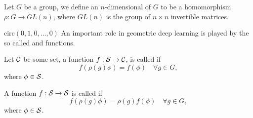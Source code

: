 \documentclass[../3.tex]{subfiles}
\begin{document}
    \begin{defn}
        Let $G$ be a group, we define an $n$-dimensional  of $G$ to be a homomorphism $\rho : G \to GL(n)$,
        where $GL(n)$ is the group of $n \times n$ invertible matrices.
    \end{defn}
    $\text{circ}(0,1,0,\dots,0)$
    An important role in geometric deep learning is played by the so called  and  functions.

    \begin{defn}
        Let $\mathcal{C}$ be some set, a function $f : \mathcal{S} \to \mathcal{C}$, is called  if
        \[ f(\rho(g)\phi) = f(\phi) \quad \forall g \in G, \]
        where $\phi \in \mathcal{S}$.
   \end{defn}

   \begin{defn}
       A function $f : \mathcal{S} \to \mathcal{S}$ is called  if 
       \[ f(\rho(g)\phi) = \rho(g)f(\phi) \quad \forall g \in G, \]
       where $\phi \in \mathcal{S}$.
   \end{defn}
   
\end{document}
